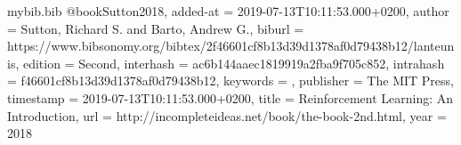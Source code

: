 \begin{filecontents*}{mybib.bib}
@book{Sutton2018,
  added-at = {2019-07-13T10:11:53.000+0200},
  author = {Sutton, Richard S. and Barto, Andrew G.},
  biburl = {https://www.bibsonomy.org/bibtex/2f46601cf8b13d39d1378af0d79438b12/lanteunis},
  edition = {Second},
  interhash = {ac6b144aaec1819919a2fba9f705c852},
  intrahash = {f46601cf8b13d39d1378af0d79438b12},
  keywords = {},
  publisher = {The MIT Press},
  timestamp = {2019-07-13T10:11:53.000+0200},
  title = {Reinforcement Learning: An Introduction},
  url = {http://incompleteideas.net/book/the-book-2nd.html},
  year = {2018 }
}
\end{filecontents*}

\documentclass[10pt,a4paper]{article}
\usepackage[utf8]{inputenc}
\usepackage[top=1.25in, bottom=1.25in, left=.75in, right=.75in]{geometry}
\usepackage{amsmath}
\usepackage{algorithmicx}
\usepackage{algpseudocode}
\usepackage{algorithm2e}
\usepackage{amsfonts}
\usepackage{mathtools}
\usepackage{amssymb}
\usepackage{xcolor}
\usepackage{natbib}
\usepackage{bibentry}
\usepackage{float}
\usepackage{fancyhdr}
\usepackage{dsfont}
\usepackage{graphicx,caption}
\renewcommand{\familydefault}{\sfdefault}
\pagestyle{fancy}
\nobibliography*
\DeclareMathOperator*{\argmax}{arg\,max}
\author{Johannes Ender}

\clearpage
\setcounter{section}{2}
\section{Temporal Difference Learning}
